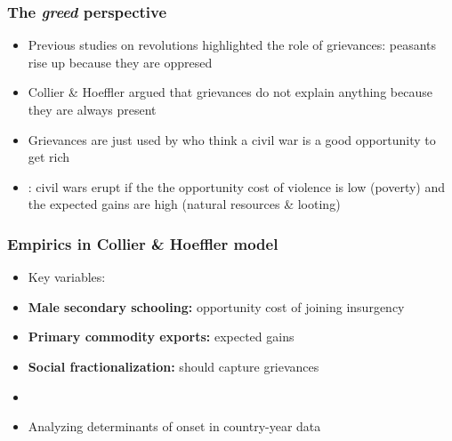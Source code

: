\documentclass[aspectratio=43]{beamer}
\begin{document}
\begin{frame}
\frametitle{The \textit{greed} perspective}
\centering

\begin{itemize}[<+->]
  \item Previous studies on revolutions highlighted the role of grievances: peasants rise up because they are oppresed
  \item Collier \& Hoeffler argued that grievances do not explain anything because they are always present
  \item Grievances are just used by  who think a civil war is a good opportunity to get rich
  \item {}: civil wars erupt if the the opportunity cost of violence is low (poverty) and the expected gains are high (natural resources \& looting)
\end{itemize}

\end{frame}

\begin{frame}
\frametitle{Empirics in Collier \& Hoeffler model}
\centering

\begin{itemize}
  \item[] Key variables:
  \item \textbf{Male secondary schooling:} opportunity cost of joining insurgency
  \item \textbf{Primary commodity exports:} expected gains
  \item \textbf{Social fractionalization:} should capture grievances
  \item[]
  \item Analyzing determinants of onset in country-year data
\end{itemize}

\end{frame}
\end{document}
